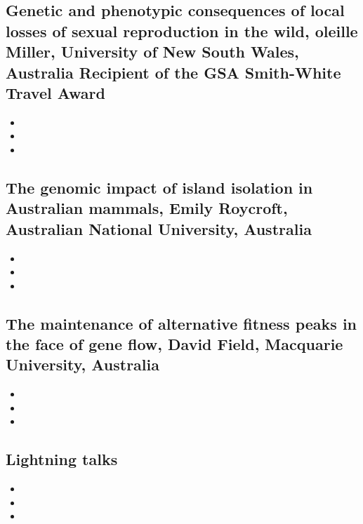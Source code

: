 \documentclass[document.tex]{subfiles}
\begin{document}
        \subsection{Genetic and phenotypic consequences of local losses of sexual reproduction in the wild, oleille Miller, University of New South Wales, Australia
        Recipient of the GSA Smith-White Travel Award}
            \begin{itemize}
                \item 
                \item 
                \item 
                \end{itemize} 

        \subsection{The genomic impact of island isolation in Australian mammals, Emily Roycroft, Australian National University, Australia}
            \begin{itemize}
                \item 
                \item 
                \item 
                \end{itemize} 

        \subsection{The maintenance of alternative fitness peaks in the face of gene flow, David Field, Macquarie University, Australia}
            \begin{itemize}
                \item 
                \item 
                \item 
                \end{itemize} 

        \subsection{Lightning talks}
            \begin{itemize}
                \item 
                \item 
                \item 
                \end{itemize} 


   
    \bib{}
\end{document}
